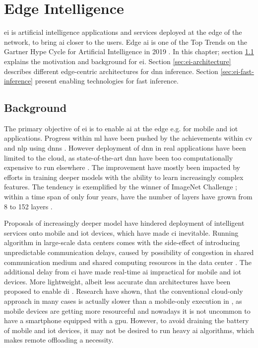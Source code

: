 \hypertarget{Edge Intelligence}{%
	\chapter{Edge Intelligence}\label{ch:edgeintelligence}}
\thispagestyle{fancy}

\acrlong{ei} is artificial intelligence applications and services deployed at the edge of the network, to bring \gls{ai} closer to the users. Edge \gls{ai} is one of the Top Trends on the Gartner Hype Cycle for Artificial Intelligence in 2019 \cite{goasduff_top_2019}. In this chapter; section \ref{sec:ei-background} explains the motivation and background for \gls{ei}. Section \ref{sec:ei-architecture} describes different edge-centric architectures for \gls{dnn} inference. Section \ref{sec:ei-fast-inference} present enabling technologies for fast inference.

\section{Background}\label{sec:ei-background}

The primary objective of \gls{ei} is to enable \gls{ai} at the edge e.g. for mobile and \gls{iot} applications. Progress within \gls{ml} have been pushed by the achievements within \gls{cv} and \gls{nlp} using \gls{dnn}s \cite{stoica_berkeley_2017}. However deployment of \gls{dnn} in real applications have been limited to the cloud, as state-of-the-art \gls{dnn} have been too computationally expensive to run elsewhere \cite{zhou_edge_2019}. The improvement have mostly been impacted by efforts in training deeper models with the ability to learn increasingly complex features. The tendency is exemplified by the winner of ImageNet Challenge ; within a time span of only four years, have the number of layers have grown from 8 to 152 layers \cite{russakovsky_imagenet_2015}. 

Proposals of increasingly deeper model have hindered deployment of intelligent services onto mobile and \gls{iot} devices, which have made \gls{ci} inevitable. Running algorithm in large-scale data centers comes with the side-effect of introducing unpredictable communication delays, caused by possibility of congestion in shared communication medium and shared computing resources in the data center \cite{shi_edge_2016}. The additional delay from \gls{ci} have made real-time \gls{ai} impractical for mobile and \gls{iot} devices. More lightweight, albeit less accurate \gls{dnn} architectures have been proposed to enable \gls{di} \cite{chen_deep_2019}. Research have shown, that the conventional cloud-only approach in many cases is actually slower than a mobile-only execution in \cite{kang_neurosurgeon:_2017}, as mobile devices are getting more resourceful and nowadays it is not uncommon to have a smartphone equipped with a \gls{gpu}. However, to avoid draining the battery of mobile and \gls{iot} devices, it may not be desired to run heavy \gls{ai} algorithms, which makes remote offloading a necessity. 

